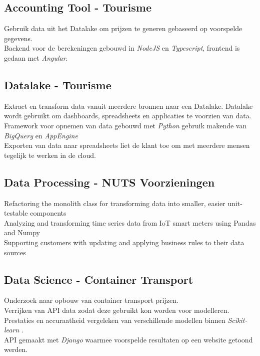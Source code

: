 \documentclass{article}
\begin{document}
\subsection{Accounting Tool - Tourisme}
Gebruik data uit het Datalake om prijzen te generen gebaseerd op voorspelde gegevens. \\
Backend voor de berekeningen gebouwd in \emph{NodeJS} en \emph{Typescript}, frontend is gedaan met \emph{Angular}.

\subsection{Datalake - Tourisme}
Extract en transform data vanuit meerdere bronnen naar een Datalake. Datalake wordt gebruikt om dashboards, spreadsheets en applicaties te voorzien van data. \\
Framework voor opnemen van data gebouwd met \emph{Python} gebruik makende van \emph{BigQuery} en \emph{AppEngine} \\
Exporten van data naar spreadsheets liet de klant toe om met meerdere mensen tegelijk te werken in de cloud.

\subsection{Data Processing - NUTS Voorzieningen}
Refactoring the monolith class for transforming data into smaller, easier unit-testable components \\
Analyzing and transforming time series data from IoT smart meters using Pandas and Numpy \\
Supporting customers with updating and applying business rules to their data sources \\

\subsection{Data Science - Container Transport}
Onderzoek naar opbouw van container transport prijzen. \\
Verrijken van API data zodat deze gebruikt kon worden voor modelleren. \\
Prestaties en accuraatheid vergeleken van verschillende modellen binnen \emph{Scikit-learn} . \\
API gemaakt met \emph{Django} waarmee voorspelde resultaten op een website getoond werden. \\

\clearpage
\end{document}
